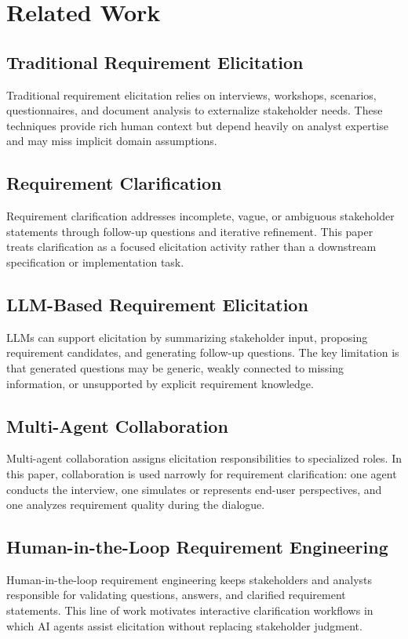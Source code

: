 \section{Related Work}
\label{related_work}

\subsection{Traditional Requirement Elicitation}
Traditional requirement elicitation relies on interviews, workshops, scenarios, questionnaires, and document analysis to externalize stakeholder needs.
These techniques provide rich human context but depend heavily on analyst expertise and may miss implicit domain assumptions.

\subsection{Requirement Clarification}
Requirement clarification addresses incomplete, vague, or ambiguous stakeholder statements through follow-up questions and iterative refinement.
This paper treats clarification as a focused elicitation activity rather than a downstream specification or implementation task.

\subsection{LLM-Based Requirement Elicitation}
LLMs can support elicitation by summarizing stakeholder input, proposing requirement candidates, and generating follow-up questions.
The key limitation is that generated questions may be generic, weakly connected to missing information, or unsupported by explicit requirement knowledge.

\subsection{Multi-Agent Collaboration}
Multi-agent collaboration assigns elicitation responsibilities to specialized roles.
In this paper, collaboration is used narrowly for requirement clarification: one agent conducts the interview, one simulates or represents end-user perspectives, and one analyzes requirement quality during the dialogue.

\subsection{Human-in-the-Loop Requirement Engineering}
Human-in-the-loop requirement engineering keeps stakeholders and analysts responsible for validating questions, answers, and clarified requirement statements.
This line of work motivates interactive clarification workflows in which AI agents assist elicitation without replacing stakeholder judgment.
